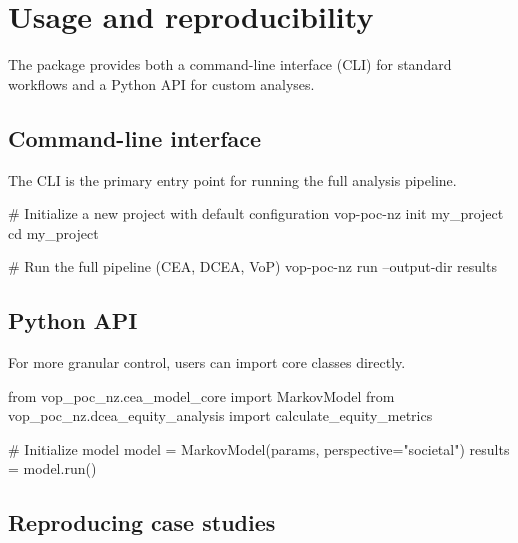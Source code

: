 \documentclass[article]{jss}
\begin{document}
\section{Usage and reproducibility} \label{sec:usage}

The package provides both a command-line interface (CLI) for standard workflows and a Python API for custom analyses.

\subsection{Command-line interface}
The CLI is the primary entry point for running the full analysis pipeline.
\begin{CodeInput}
# Initialize a new project with default configuration
vop-poc-nz init my_project
cd my_project

# Run the full pipeline (CEA, DCEA, VoP)
vop-poc-nz run --output-dir results
\end{CodeInput}

\subsection{Python API}
For more granular control, users can import core classes directly.
\begin{CodeInput}
from vop_poc_nz.cea_model_core import MarkovModel
from vop_poc_nz.dcea_equity_analysis import calculate_equity_metrics

# Initialize model
model = MarkovModel(params, perspective="societal")
results = model.run()
\end{CodeInput}

\subsection{Reproducing case studies}
\end{document}
